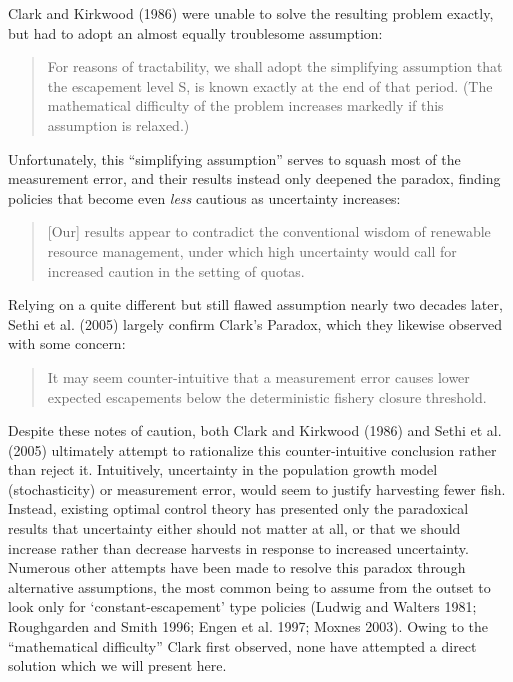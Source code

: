 \documentclass[3p]{elsarticle} %
\begin{document}
Clark and Kirkwood (1986) were unable to solve the resulting problem
exactly, but had to adopt an almost equally troublesome assumption:

\begin{quote}
For reasons of tractability, we shall adopt the simplifying assumption
that the escapement level S, is known exactly at the end of that period.
(The mathematical difficulty of the problem increases markedly if this
assumption is relaxed.)
\end{quote}

Unfortunately, this ``simplifying assumption'' serves to squash most of
the measurement error, and their results instead only deepened the
paradox, finding policies that become even \emph{less} cautious as
uncertainty increases:

\begin{quote}
{[}Our{]} results appear to contradict the conventional wisdom of
renewable resource management, under which high uncertainty would call
for increased caution in the setting of quotas.
\end{quote}

Relying on a quite different but still flawed assumption nearly two
decades later, Sethi et al. (2005) largely confirm Clark's Paradox,
which they likewise observed with some concern:

\begin{quote}
It may seem counter-intuitive that a measurement error causes lower
expected escapements below the deterministic fishery closure threshold.
\end{quote}

Despite these notes of caution, both Clark and Kirkwood (1986) and Sethi
et al. (2005) ultimately attempt to rationalize this counter-intuitive
conclusion rather than reject it. Intuitively, uncertainty in the
population growth model (stochasticity) or measurement error, would seem
to justify harvesting fewer fish. Instead, existing optimal control
theory has presented only the paradoxical results that uncertainty
either should not matter at all, or that we should increase rather than
decrease harvests in response to increased uncertainty. Numerous other
attempts have been made to resolve this paradox through alternative
assumptions, the most common being to assume from the outset to look
only for `constant-escapement' type policies (Ludwig and Walters 1981;
Roughgarden and Smith 1996; Engen et al. 1997; Moxnes 2003). Owing to
the ``mathematical difficulty'' Clark first observed, none have
attempted a direct solution which we will present here.
\end{document}
